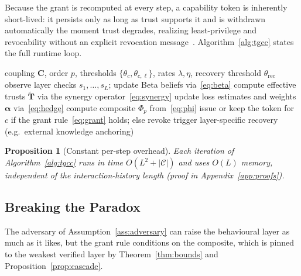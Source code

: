 \documentclass[sigconf,anonymous]{acmart}
\theoremstyle{plain}
\newtheorem{proposition}{Proposition}
\theoremstyle{definition}
\theoremstyle{remark}
\begin{document}
Because the grant is recomputed at every step, a capability token is inherently
short-lived: it persists only as long as trust supports it and is withdrawn automatically
the moment trust degrades, realizing least-privilege and revocability without an explicit
revocation message~\cite{nist800207,miller2006robust}. Algorithm~\ref{alg:tgcc} states the
full runtime loop.

\begin{algorithm}[t]
\caption{TGCC Runtime Loop (per agent, per step)}
\label{alg:tgcc}
\begin{algorithmic}[1]
\REQUIRE coupling $\mathbf{C}$, order $p$, thresholds $\{\theta_c,\theta_{c,\ell}\}$,
         rates $\lambda,\eta$, recovery threshold $\theta_{\mathrm{rec}}$
\STATE observe layer checks $s_1,\dots,s_L$; update Beta beliefs via~\eqref{eq:beta}
\STATE compute effective trusts $\tilde{\mathbf{T}}$ via the synergy operator~\eqref{eq:synergy}
\STATE update loss estimates and weights $\boldsymbol\alpha$ via~\eqref{eq:hedge}
\STATE compute composite $\Phi_p$ from~\eqref{eq:phi}
  \STATE issue or keep the token for $c$ if the grant rule~\eqref{eq:grant} holds; else revoke
\ENDFOR
{}
  \STATE trigger layer-specific recovery (e.g.\ external knowledge anchoring)
\ENDIF
\end{algorithmic}
\end{algorithm}

\begin{proposition}[Constant per-step overhead]
\label{prop:complexity}
Each iteration of Algorithm~\ref{alg:tgcc} runs in time $O(L^2+|\mathcal{C}|)$ and uses
$O(L)$ memory, independent of the interaction-history length (proof in
Appendix~\ref{app:proofs}).
\end{proposition}

\subsection{Breaking the Paradox}
The adversary of Assumption~\ref{ass:adversary} can raise the behavioural layer as much as
it likes, but the grant rule conditions on the composite, which is pinned to the weakest
verified layer by Theorem~\ref{thm:bounds} and Proposition~\ref{prop:cascade}.
\end{document}
